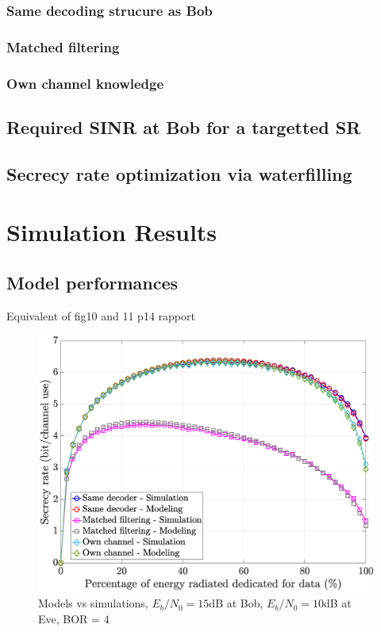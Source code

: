 \documentclass[journal,comsoc]{IEEEtran}
\let\MYoriglatexcaption\caption
\renewcommand{\caption}[2][\relax]{\MYoriglatexcaption[#2]{#2}}
\begin{document}
\subsubsection{Same decoding strucure as Bob}
\subsubsection{Matched filtering}
\subsubsection{Own channel knowledge}


\subsection{Required SINR at Bob for a targetted SR}

\subsection{Secrecy rate optimization via waterfilling}




\section{Simulation Results}



\subsection{Model performances}
{\color{red} Equivalent of fig10 and 11 p14 rapport} 
\begin{figure}[h!t]
	\centering
	\includegraphics[width=1\linewidth]{graphs/SISO_no_corr_modelvsimu_EbN0b15_EbN0e10.eps}
	\caption{Models vs simulations, $E_b/N_0 = 15$dB at Bob,  $E_b/N_0 = 10$dB at Eve, BOR = 4}
	\label{fig_modelvssimu}
\end{figure}
\end{document}
